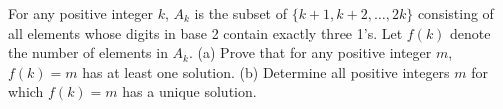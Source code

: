 For any positive integer $k$, $A_k$ is the subset of $\{k+1, k+2, \ldots, 2k\}$ consisting of all elements whose digits in base 2 contain exactly three 1's. Let $f(k)$ denote the number of elements in $A_k$.
(a) Prove that for any positive integer $m$, $f(k) = m$ has at least one solution.
(b) Determine all positive integers $m$ for which $f(k) = m$ has a unique solution.
